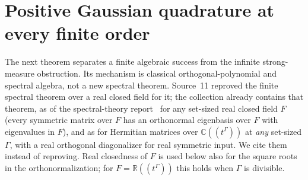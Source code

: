 \documentclass[11pt]{article}
\numberwithin{equation}{section}
\theoremstyle{definition}
\theoremstyle{remark}
\newcommand{\R}{\mathbb R}
\newcommand{\C}{\mathbb C}
\begin{document}
\section{Positive Gaussian quadrature at every finite order}
\label{meas:sec:quadrature}

The next theorem separates a finite algebraic success from the infinite
strong-measure obstruction. Its mechanism is classical orthogonal-polynomial and
spectral algebra, not a new spectral theorem. Source~11 reproved the finite
spectral theorem over a real closed field for it; the collection already
contains that theorem, as  of the spectral-theory
report~\cite{repospec} for any set-sized real closed field $F$ (every symmetric
matrix over $F$ has an orthonormal eigenbasis over $F$ with eigenvalues in $F$),
and as  for Hermitian matrices over $\C((t^\Gamma))$
at \emph{any} set-sized $\Gamma$, with a real orthogonal diagonalizer for real
symmetric input. We cite them instead of reproving. Real closedness of $F$ is
used below also for the square roots in the orthonormalization; for
$F=\R((t^\Gamma))$ this holds when $\Gamma$ is divisible.
\end{document}
